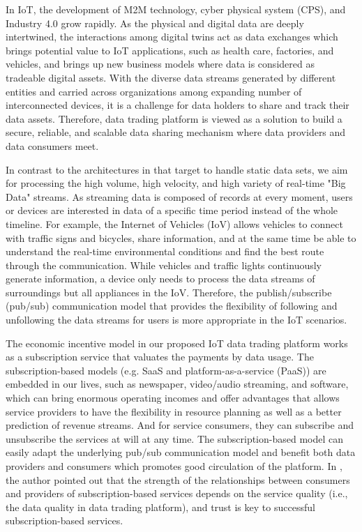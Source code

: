 \begin{spacing}{2.0}

In IoT, the development of M2M technology\cite{M2M}, cyber physical system (CPS)\cite{CPS}, and Industry 4.0 grow rapidly. As the physical and digital data are deeply intertwined, the interactions among digital twins act as data exchanges\cite{digitaltwin} which brings potential value to IoT applications, such as health care\cite{healthCare}, factories, and vehicles\cite{AutonomousDriving}, and brings up new business models where data is considered as tradeable digital assets. With the diverse data streams generated by different entities and carried across organizations among expanding number of interconnected devices, it is a challenge for data holders to share and track their data assets. Therefore, data trading platform is viewed as a solution to build a secure, reliable, and scalable data sharing mechanism where data providers and data consumers meet.

In contrast to the architectures in \cite{DIaas, MARSA} that target to handle static data sets, we aim for processing the high volume, high velocity, and high variety of real-time "Big Data" streams\cite{BigData}. As streaming data is composed of records at every moment, users or devices are interested in data of a specific time period instead of the whole timeline. For example, the Internet of Vehicles (IoV) allows vehicles to connect with traffic signs and bicycles, share information, and at the same time be able to understand the real-time environmental conditions and find the best route through the communication. While vehicles and traffic lights continuously generate information, a device only needs to process the data streams of surroundings but all appliances in the IoV. Therefore, the publish/subscribe (pub/sub) communication model that provides the flexibility of following and unfollowing the data streams for users is more appropriate in the IoT scenarios.

The economic incentive model in our proposed IoT data trading platform works as a subscription service that valuates the payments by data usage. The subscription-based models (e.g. SaaS and platform-as-a-service (PaaS)) are embedded in our lives, such as newspaper, video/audio streaming, and software, which can bring enormous operating incomes and offer advantages that allows service providers to have the flexibility in resource planning as well as a better prediction of revenue streams. And for service consumers, they can subscribe and unsubscribe the services at will at any time. The subscription-based model can easily adapt the underlying pub/sub communication model and benefit both data providers and consumers which promotes good circulation of the platform. In \cite{SaaS}, the author pointed out that the strength of the relationships between consumers and providers of subscription-based services depends on the service quality (i.e., the data quality in data trading platform), and trust is key to successful subscription-based services.


\end{spacing}
